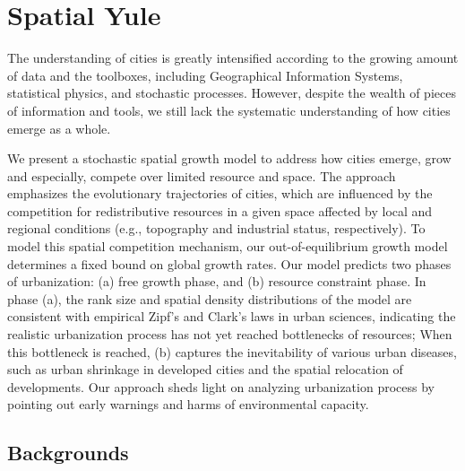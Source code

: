 \chapter{Spatial Yule}
\label{Chap:sy}

The understanding of cities is greatly intensified according to the growing amount of data and the toolboxes, including Geographical Information Systems, statistical physics, and stochastic processes. However, despite the wealth of pieces of information and tools, we still lack the systematic understanding of how cities emerge as a whole. 

We present a stochastic spatial growth model to address how cities emerge, grow and especially, compete over limited resource and space. The approach emphasizes the evolutionary trajectories of cities, which are influenced by the competition for redistributive resources in a given space affected by local and regional conditions (e.g., topography and industrial status, respectively). To model this spatial competition mechanism, our out-of-equilibrium growth model determines a fixed bound on global growth rates. Our model predicts two phases of urbanization: (a) free growth phase, and (b) resource constraint phase. In phase (a), the rank size and spatial density distributions of the model are consistent with empirical Zipf's and Clark's laws in urban sciences, indicating the realistic urbanization process has not yet reached bottlenecks of resources; When this bottleneck is reached, (b) captures the inevitability of various urban diseases, such as urban shrinkage in developed cities and the spatial relocation of developments. Our approach sheds light on analyzing urbanization process by pointing out early warnings and harms of environmental capacity.


\section{Backgrounds} 

